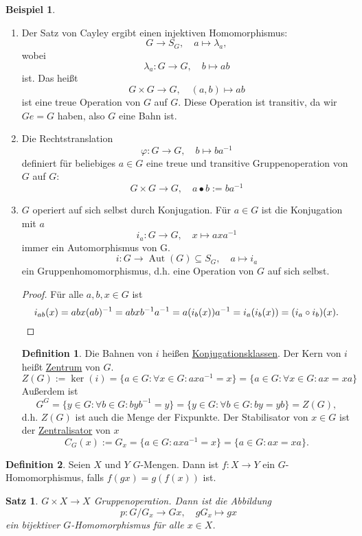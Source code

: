 \documentclass[12pt]{scrartcl} %
\DeclareMathOperator{\Aut}{Aut}
\newtheorem{thm}{Satz}
\theoremstyle{definition}
\newtheorem*{defn}{Definition}
\newtheorem{ex}{Beispiel}
\theoremstyle{remark}
\newcommand{\defi}{\underline}
\begin{document}
\begin{ex}
	\begin{enumerate}
	\item Der Satz von Cayley ergibt einen injektiven Homomorphismus:
		$$G \to S_G, \quad a \mapsto \lambda_a,$$ wobei $$\lambda_a: G \to G, \quad b \mapsto ab$$ ist.
		Das heißt $$G\times G \to G, \quad (a,b) \mapsto ab$$ ist eine treue Operation von \(G\) auf \(G\).
		Diese Operation ist transitiv, da wir $Ge=G$ haben, also $G$ eine Bahn ist.
	\item Die Rechtstranslation
		$$\varphi : G \to G, \quad b \mapsto ba^{-1}$$
		definiert für beliebiges $a\in G$ eine treue und transitive Gruppenoperation von $G$ auf $G$:
		$$G \times G \to G, \quad a \bullet b := ba^{-1}$$
	\item $G$ operiert auf sich selbst durch Konjugation.
		Für \(a \in G\) ist die Konjugation mit $a$
		$$i_a : G \to G, \quad x \mapsto axa^{-1}$$
		immer ein Automorphismus von G.
		$$i: G \to \Aut(G) \subseteq S_G, \quad a \mapsto i_a$$
		ein Gruppenhomomorphismus, d.h. eine Operation von $G$ auf sich selbst.
		\begin{proof}
			Für alle \(a, b, x \in G\) ist \[i_{ab}(x)=abx(ab)^{-1}=abxb^{-1}a^{-1}=a(i_b(x))a^{-1}=i_a(i_b(x))=(i_a\circ i_b)(x).\qedhere\]
		\end{proof}
		\begin{defn}
			Die Bahnen von $i$ heißen \defi{Konjugationsklassen}.
			Der Kern von $i$ heißt \defi{Zentrum} von $G$.
			\[Z(G) := \ker(i) = \{a \in G : \forall x \in G: axa^{-1}=x\} = \{a \in G : \forall x \in G: ax =xa\}\]
			Außerdem ist \[G^G = \{y \in G : \forall b \in G: byb^{-1}=y\} = \{y \in G: \forall b \in G: by = yb\} = Z(G),\]	
			d.h. $Z(G)$ ist auch die Menge der Fixpunkte.
			Der Stabilisator von $x \in G$ ist der \defi{Zentralisator} von \(x\) \[C_G(x) := G_x = \{a \in G : axa^{-1}=x\} = \{ a \in G : ax = xa\}.\]
		\end{defn}		
	\end{enumerate}
\end{ex}

\begin{defn}
	Seien $X$ und $Y$ $G$-Mengen. Dann ist $f: X \rightarrow Y$ ein $G$-Homomorphismus, falls $f(gx)=g(f(x))$ ist. %
\end{defn}

\begin{thm}
	$G \times X \rightarrow X$ Gruppenoperation. Dann ist die Abbildung
	$$p: G/G_x \to Gx, \quad gG_x \mapsto gx$$
	ein bijektiver $G$-Homomorphismus für alle $x \in X$.
\end{thm}
\end{document}
